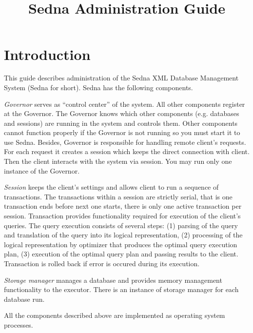 \documentclass[a4paper,12pt]{article}
\title{Sedna Administration Guide}
\date{}
\newcommand{\TocAt}[6]{}
\begin{document}
\sloppy
\maketitle
\TocAt*{section,subsection,subsubsection}
\TocAt*{subsection,subsubsection}
\tableofcontents

\section{Introduction}
This guide describes administration of the Sedna XML Database Management System (Sedna for short). Sedna has the following components.

\emph{Governor} serves as  ``control center'' of the system. All other components register at the Governor. The Governor knows which other components (e.g. databases and sessions) are running in the system and controls them. Other components cannot function properly if the Governor is not running so you must start it to use Sedna. Besides, Governor is responsible for handling remote client's requests. For each request it creates a session which keeps the direct connection with client. Then the client interacts with the system via session. You may run only one instance of the Governor.


\emph{Session} keeps the client's settings and allows client to run a sequence of transactions. The transactions within a session are strictly serial, that is one transaction ends before next one starts, there is only one active transaction per session. Transaction provides functionality required for execution of the client's queries. The query execution consists of several steps: (1) parsing of the query and translation of the query into its logical representation, (2) processing of the logical representation by optimizer that produces the optimal query execution plan, (3) execution of the optimal query plan and passing results to the client. Transaction is rolled back if error is occured during its execution.

\emph{Storage manager} manages a database and provides memory management functionality to the executor. There is an instance of storage manager for each database run. 

All the components described above are implemented as operating system processes.
 
\end{document}
